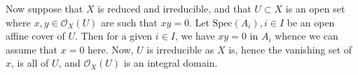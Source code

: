 \documentclass{article}
\theoremstyle{definition}
\newcommand{\oo}{\mathcal{O}}
\newcommand{\Spec}{\text{Spec}}
\begin{document}
Now suppose that $X$ is reduced and irreducible, and that $U \subset X$ is an
open set where $x, y \in \oo_{X}(U)$ are such that $xy = 0$. Let $\Spec(A_i), i
\in I$ be an open affine cover of $U$. Then for a given $i \in I$, we have $xy
= 0$ in $A_i$ whence we can assume that $x = 0$ here. Now, $U$ is irreducible
as $X$ is, hence the vanishing set of $x$, is all of $U$, and $\oo_X(U)$ is an
integral domain.
\end{document}
